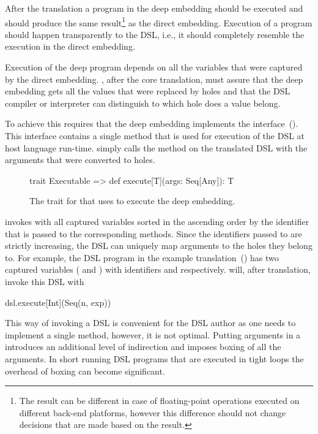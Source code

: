 After the translation a program in the deep embedding should be executed and should produce
the same result\footnote{The result can be different in case of floating-point operations executed on
different back-end platforms, however this difference should not change decisions that are made based on the result.}
as the direct embedding. Execution of a program should happen transparently to the DSL, i.e., it should completely
resemble the execution in the direct embedding.

Execution of the deep program depends on all the variables that were captured by the
direct embedding. \yy, after the core translation, must assure that the deep embedding
gets all the values that were replaced by holes and that the DSL compiler or interpreter
can distinguish to which hole does a value belong.

To achieve this \yy requires that the deep embedding implements the
  interface~(). This interface
 contains a single method  that is used for execution of
 the DSL at host language run-time. \yy simply calls the method 
on the translated DSL with the arguments that were converted to holes.

\begin{figure}
\begin{listingtiny}
trait Executable { =>
  def execute[T](args: Seq[Any]): T
}
\end{listingtiny}
\caption{The trait for that \yy uses to execute the deep embedding.}
\label{fig:executable}
\end{figure}


\yy invokes  with all captured variables sorted in the ascending order by the identifier
that is passed to the corresponding  methods. Since the identifiers passed to
 are strictly increasing, the DSL can uniquely map arguments to the holes they belong to. For example, the DSL program in the example translation~() has two captured variables ( and ) with identifiers  and  respectively.
\yy will, after translation, invoke this DSL with\begin{lstparagraph}
dsl.execute[Int](Seq(n, exp))
\end{lstparagraph}

This way of invoking a DSL is convenient for the DSL author as one needs to implement
a single method, however, it is not optimal. Putting arguments in a  introduces an
additional level of indirection and imposes boxing of all the arguments. In short
running DSL programs that are executed in tight loops the overhead of boxing can become
significant.

